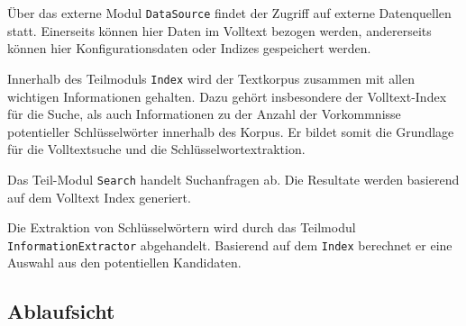


Über das externe Modul \texttt{DataSource} findet der Zugriff auf externe Datenquellen statt. Einerseits können hier Daten im Volltext bezogen werden, andererseits können hier Konfigurationsdaten oder Indizes gespeichert werden.





Innerhalb des Teilmoduls \texttt{Index} wird der Textkorpus zusammen mit allen wichtigen Informationen gehalten. Dazu gehört insbesondere der Volltext-Index für die Suche, als auch Informationen zu der Anzahl der Vorkommnisse potentieller Schlüsselwörter innerhalb des Korpus. Er bildet somit die Grundlage für die Volltextsuche und die Schlüsselwortextraktion.




Das Teil-Modul \texttt{Search} handelt Suchanfragen ab. Die Resultate werden basierend auf dem Volltext Index generiert. 





Die Extraktion von Schlüsselwörtern wird durch das Teilmodul \texttt{In\-for\-ma\-tion\-Ex\-trac\-tor} abgehandelt. Basierend auf dem \texttt{Index} berechnet er eine Auswahl aus den potentiellen Kandidaten.

\newpage


\subsection{Ablaufsicht}

